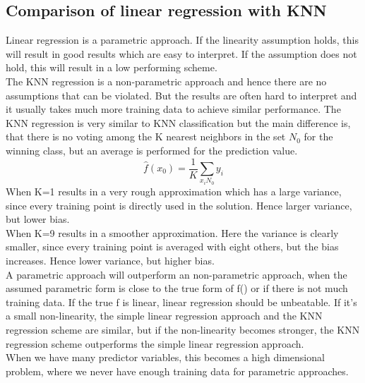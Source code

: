 \documentclass[../document.tex]{subfiles}
\begin{document}
	\subsection{Comparison of linear regression with KNN}
	Linear regression is a parametric approach. If the linearity assumption holds, this will result in good results which are easy to interpret. If the assumption does not hold, this will result in a low performing scheme.\\
	The KNN regression is a non-parametric approach and hence there are no assumptions that can be violated. But the results are often hard to interpret and it usually takes much more training data to achieve similar performance. The KNN regression is very similar to KNN classification but the main difference is, that there is no voting among the K nearest neighbors in the set \(N_{0}\) for the winning class, but an average is performed for the prediction value.
	\begin{equation}
		\hat{f}(x_{0})=\frac{1}{K}\sum_{x_{i}N_{0}}y_{i}
	\end{equation}
	When K=1 results in a very rough approximation which has a large variance, since every training point is directly used in the solution. Hence larger variance, but lower bias.\\
	When K=9 results in a smoother approximation. Here the variance is clearly smaller, since every training point is averaged with eight others, but the bias increases. Hence lower variance, but higher bias.\\
	A parametric approach will outperform an non-parametric approach, when the assumed parametric form is close to the true form of f() or if there is not much training data. If the true f is linear, linear regression should be unbeatable. If it's a small non-linearity, the simple linear regression approach and the KNN regression scheme are similar, but if the non-linearity becomes stronger, the KNN regression scheme outperforms the simple linear regression approach.\\
	When we have many predictor variables, this becomes a high dimensional problem, where we never have enough training data for parametric approaches.
\end{document}
